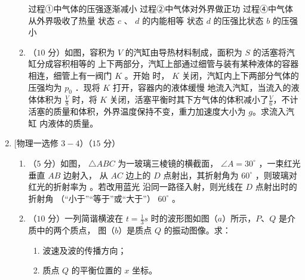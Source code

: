 \begin{enumerate}
\begin{enumerate}
\fivechoices
{过程①中气体的压强逐渐减小}
{过程②中气体对外界做正功}
{过程④中气体从外界吸收了热量}
{状态 $ c $ 、 $ d $ 的内能相等}
{状态 $ d $ 的压强比状态 $ b $ 的压强小}



\item 
（$ 10 $ 分）如图，容积为 $ V $ 的汽缸由导热材料制成，面积为 $ S $ 的活塞将汽缸分成容积相等的
上下两部分，汽缸上部通过细管与装有某种液体的容器相连，细管上有一阀门 $ K $ 。开始
时， $ K $ 关闭，汽缸内上下两部分气体的压强均为 $ p_{0} $ ．现将 $ K $ 打开，容器内的液体缓慢
地流入汽缸，当流入的液体体积为
$ \frac{V}{8} $
时，将 $ K $ 关闭，活塞平衡时其下方气体的体积减小了$ \frac{V}{6} $，不计活塞的质量和体积，外界温度保持不变，重力加速度大小为 $ g $。求流入汽缸
内液体的质量。
\begin{figure}[h!]
\flushright

\end{figure}




\end{enumerate}




\newpage
\item 

[物理一选修 $ 3-4 $）（$ 15 $ 分）


\begin{enumerate}
\renewcommand{\labelenumi}{\arabic{enumi}.}
\item
（$ 5 $ 分）如图， $ \triangle ABC $ 为一玻璃三棱镜的横截面， $ \angle A=30 ^{\circ} $ ，一束红光垂直 $ AB $ 边射入，
从 $ AC $ 边上的 $ D $ 点射出，其折射角为 $ 60 ^{\circ} $ ，则玻璃对红光的折射率为  。若改用蓝光
沿同一路径入射，则光线在 $ D $ 点射出时的折射角  （“小于”“等于”或“大于”） $ 60 ^{\circ} $ 。
\begin{figure}[h!]
\centering

\end{figure}




\item 
（$ 10 $ 分）一列简谐横波在 $ t= \frac{ 1 }{ 3 } s $ 时的波形图如图（$ a $）所示，$ P $、$ Q $ 是介质中的两个质点，
图（$ b $）是质点 $ Q $ 的振动图像。求：
\begin{enumerate}
\renewcommand{\labelenumiii}{\roman{enumiii}.}
\item
波速及波的传播方向；
\item 
质点 $ Q $ 的平衡位置的 $ x $ 坐标。





\end{enumerate}
\end{enumerate}
\end{enumerate}
